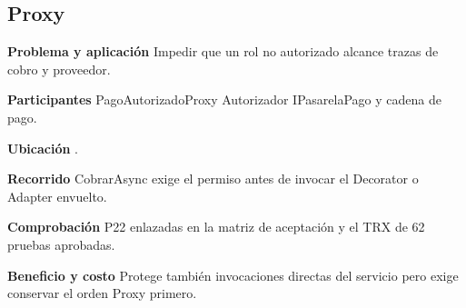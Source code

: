 \noindent\begin{minipage}{\linewidth}
\subsection{Proxy}
\textbf{Problema y aplicación} Impedir que un rol no autorizado alcance trazas de cobro y proveedor.

\textbf{Participantes} PagoAutorizadoProxy Autorizador IPasarelaPago y cadena de pago.

\textbf{Ubicación} \href{https://github.com/Alan77-bot/LogiMarket360Alan/blob/68bda51063441415524ede51bdf61649ee9b4973/LogiMarket.Application/Seguridad/PagoAutorizadoProxy.cs#L10}{}.

\textbf{Recorrido} CobrarAsync exige el permiso antes de invocar el Decorator o Adapter envuelto.


\textbf{Comprobación} P22 enlazadas en la matriz de aceptación y el TRX de 62 pruebas aprobadas.

\textbf{Beneficio y costo} Protege también invocaciones directas del servicio pero exige conservar el orden Proxy primero.

\end{minipage}\par\smallskip
